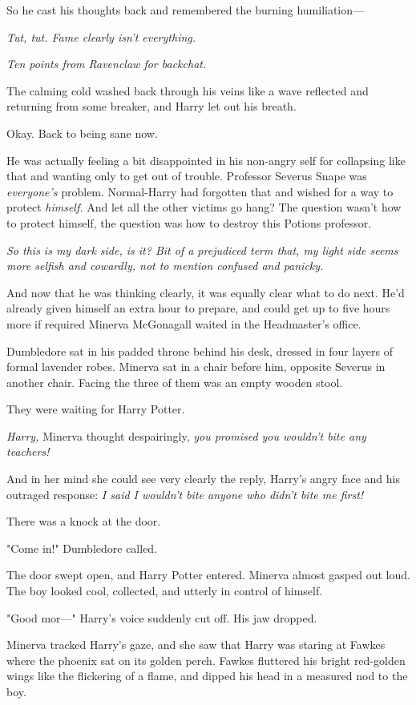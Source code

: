 So he cast his thoughts back and remembered the burning humiliation\mbox{---}

\emph{Tut, tut. Fame clearly isn't everything.}

\emph{Ten points from Ravenclaw for backchat.}

The calming cold washed back through his veins like a wave reflected and
returning from some breaker, and Harry let out his breath.

Okay. Back to being sane now.

He was actually feeling a bit disappointed in his non-angry self for collapsing
like that and wanting only to get out of trouble. Professor Severus Snape was
\emph{everyone's} problem. Normal-Harry had forgotten that and wished for a way
to protect \emph{himself.} And let all the other victims go hang? The question
wasn't how to protect himself, the question was how to destroy this Potions
professor.

\emph{So this is my dark side, is it? Bit of a prejudiced term that, my light
side seems more selfish and cowardly, not to mention confused and panicky.}

And now that he was thinking clearly, it was equally clear what to do next.
He'd already given himself an extra hour to prepare, and could get up to five
hours more if required{\el}
\sbreak
Minerva McGonagall waited in the Headmaster's office.

Dumbledore sat in his padded throne behind his desk, dressed in four layers of
formal lavender robes. Minerva sat in a chair before him, opposite Severus in
another chair. Facing the three of them was an empty wooden stool.

They were waiting for Harry Potter.

\emph{Harry,} Minerva thought despairingly, \emph{you promised you wouldn't
bite any teachers!}

And in her mind she could see very clearly the reply, Harry's angry face and
his outraged response: \emph{I said I wouldn't bite anyone who didn't bite me
first!}

There was a knock at the door.

"Come in!" Dumbledore called.

The door swept open, and Harry Potter entered. Minerva almost gasped out loud.
The boy looked cool, collected, and utterly in control of himself.

"Good mor\mbox{---}" Harry's voice suddenly cut off. His jaw dropped.

Minerva tracked Harry's gaze, and she saw that Harry was staring at Fawkes
where the phoenix sat on its golden perch. Fawkes fluttered his bright
red-golden wings like the flickering of a flame, and dipped his head in a
measured nod to the boy.

